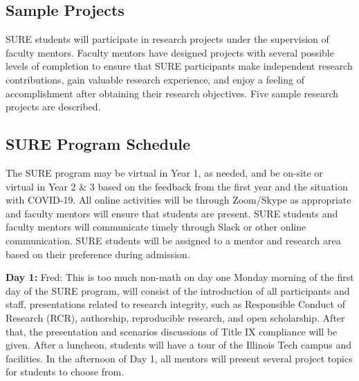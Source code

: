 \documentclass[11pt]{NSFamsart}
\newcommand{\FJHNote}[1]{{\color{blue}Fred: #1}}
\begin{document}
\subsection{Sample Projects}
SURE students will participate in research projects under the supervision of faculty mentors. Faculty
mentors have designed projects with several possible levels of completion to ensure that SURE participants
make independent research contributions, gain valuable research experience, and enjoy a feeling of
accomplishment after obtaining their research objectives. Five sample research projects are described.












\subsection{SURE Program Schedule}
The SURE program may be virtual in Year 1,  as needed, and be on-site or virtual in Year 2 \& 3 based on the feedback from the first year and the situation with COVID-19. All online activities will be through Zoom/Skype
as appropriate and faculty mentors will ensure that students are present. SURE students and faculty
mentors will communicate timely through Slack or other online communication. SURE students will be
assigned to a mentor and research area based on their preference during admission.

\noindent \textbf{Day 1:} \FJHNote{This is too much non-math on day one}
Monday morning of the first day of the SURE program, will consist of the introduction of all participants and staff, presentations related to research integrity, such as Responsible Conduct of Research (RCR), authorship, reproducible research, and open scholarship. After that, the presentation and scenarios discussions of Title IX compliance will be given. 
After a luncheon, students will have a tour of the Illinois Tech campus and facilities.  In the afternoon of Day 1, all mentors will present several project topics for students to choose from.
\end{document}
